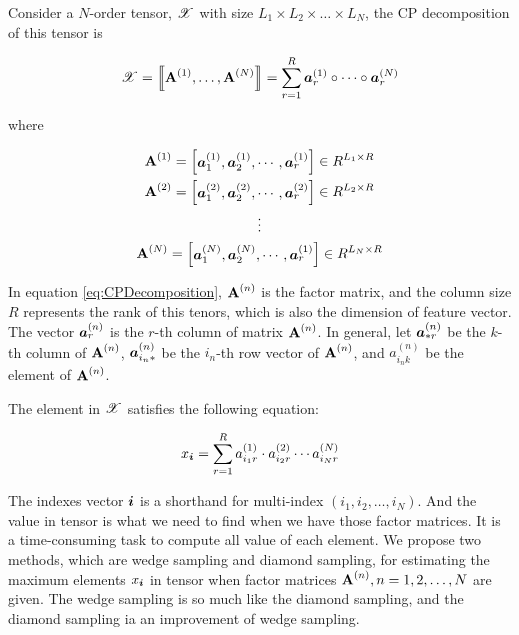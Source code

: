 \documentclass{article}
\newcommand{\Sca}[3]{{#1}^{(#2)}_{i_#2#3}}%
\newcommand{\T}[1]{\boldsymbol{\mathscr{\MakeUppercase{#1}}}}
\newcommand{\KT}[1]{\left\llbracket #1 \right\rrbracket}
\newcommand{\V}[1]{{\bm{{\MakeLowercase{#1}}}}}
\newcommand{\VnC}[3]{\V{#1}^{(#2)}_{#3}}
\newcommand{\Varow}[1]{\V{a}^{(#1)}_{i_#1*}}
\newcommand{\Vacol}[1]{\V{a}^{(#1)}_{*r}}
\newcommand{\M}[1]{{\bm{\mathbf{\MakeUppercase{#1}}}}}
\newcommand{\Mn}[2]{\M{#1}^{(#2)}}
\begin{document}
Consider a $N$-order tensor, $\T{X}$ with size $L_1\times L_2\times\ldots\times L_N$, the CP decomposition of this tensor is

\begin{equation}\label{eq:CPDecomposition}
\T{X}= \KT{ \Mn{A}{1},\dots,\Mn{A}{N}} =
\sum_{r=1}^{R}\VnC{A}{1}{r} \circ \cdots \circ \VnC{A}{N}{r}
\end{equation}

where

\begin{gather*}\label{eq:ColumnVectorsForm}
\M{A}^{(1)} =
\begin{bmatrix}\VnC{a}{1}{1},\VnC{a}{1}{2},\cdots,\VnC{a}{1}{r}\end{bmatrix}\in R^{L_1\times R}\\
\M{A}^{(2)} =
\begin{bmatrix}\VnC{a}{2}{1},\VnC{a}{2}{2},\cdots,\VnC{a}{2}{r}\end{bmatrix}\in R^{L_2\times R}\\
\vdots\\
\M{A}^{(N)} =
\begin{bmatrix}\VnC{a}{N}{1},\VnC{a}{N}{2},\cdots,\VnC{a}{1}{r}\end{bmatrix}\in R^{L_N\times R}\\
\end{gather*}

In equation \ref{eq:CPDecomposition}, $\M{A}^{(n)}$ is the factor matrix, and the column size $R$ represents the rank of this tenors, which is also the dimension of feature vector. The vector $\VnC{a}{n}{r}$ is the $r$-th column of matrix $\Mn{A}{n}$.
In general, let $\Vacol{n}$ be the $k$-th column of $\M{A}^{(n)}$, $\Varow{n}$ be the $i_n$-th row vector of $\M{A}^{(n)}$, and $\Sca{a}{n}{k}$ be the element of $\M{A}^{(n)}$.

The element in $\T{X}$ satisfies the following equation:

\begin{equation}\label{eq:ValueInTensor}
x_\V{i} = \sum_{r=1}^{R}\Sca{a}{1}{r}\cdot\Sca{a}{2}{r}\cdots\Sca{a}{N}{r}
\end{equation}

The indexes vector $\V{i}$ is a shorthand for multi-index $(i_1,i_2,\ldots,i_N)$. And the value in tensor is what we need to find when we have those factor matrices. It is a time-consuming task to compute all value of each element. We propose two methods, which are wedge sampling and diamond sampling, for
estimating the maximum elements $x_\V{i}$ in tensor when factor matrices $\Mn{A}{n}, n = 1,2,\ldots,N$ are given. The wedge sampling is so much like the diamond sampling, and the diamond sampling ia an improvement of wedge sampling.
\end{document}
